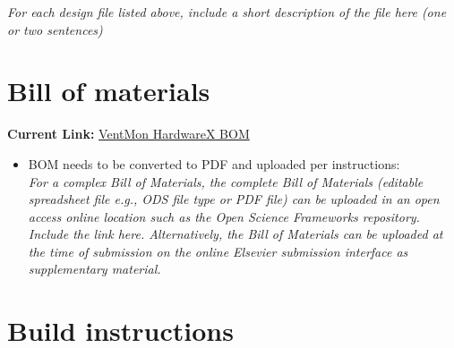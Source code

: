 \documentclass[11pt, letterpaper]{article}
\begin{document}
\textit{For each design file listed above, include a short description of the file here (one or two sentences)}

\section{Bill of materials}




{\bf Current Link:} \href{https://docs.google.com/spreadsheets/d/1EaXni1Mxnvv0jaeDQ9I1xbvPcNkRtYN8TABCBzB3cpw/edit#gid=1846296871}{VentMon HardwareX BOM}

\begin{itemize}
\item BOM needs to be converted to PDF and uploaded per instructions: \\
\textit{For a complex Bill of Materials, the complete Bill of Materials (editable spreadsheet file e.g., ODS file type or PDF file) can be uploaded in an open access online location such as the Open Science Frameworks repository. Include the link here. Alternatively, the Bill of Materials can be uploaded at the time of submission on the online Elsevier submission interface as supplementary material.}
\end{itemize}


\section{Build instructions}
\end{document}
